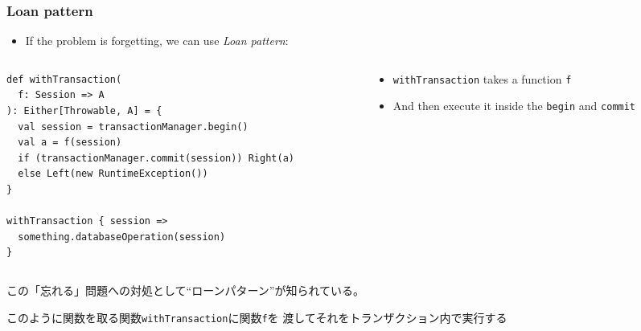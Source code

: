 \begin{frame}[fragile]
  \frametitle{Loan pattern}

  \begin{itemize}
    \item If the problem is forgetting,
    we can use \emph{Loan pattern}:
  \end{itemize}

  \begin{columns}
    \begin{column}{0.52\textwidth}
\begin{lstlisting}[style=scala]
def withTransaction(
  f: Session => A
): Either[Throwable, A] = {
  val session = transactionManager.begin()
  val a = f(session)
  if (transactionManager.commit(session)) Right(a)
  else Left(new RuntimeException())
}

withTransaction { session =>
  something.databaseOperation(session)
}
\end{lstlisting}
    \end{column}
    \begin{column}{0.48\textwidth}

      \pause
      \begin{itemize}
        \setlength{\itemindent}{0em}
        \item<+-> \lstinline|withTransaction| takes a function \lstinline|f|

        \item<+-> And then execute it inside the \lstinline|begin| and \lstinline|commit|
      \end{itemize}

    \end{column}
  \end{columns}
  \begin{notes}
    \item この「忘れる」問題への対処として``ローンパターン''が知られている。

    \item このように関数を取る関数\lstinline|withTransaction|に関数\lstinline|f|を
    渡してそれをトランザクション内で実行する


\end{notes}
\end{frame}
